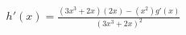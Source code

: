 \documentclass[preview]{standalone}
\begin{document}
\begin{align*}
h'(x) = \frac{(3x^3+2x)(2x)-(x^2)g'(x)}{(3x^3+2x)^2}
\end{align*}
\end{document}
